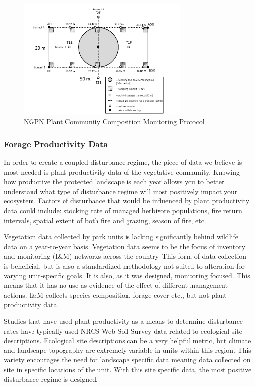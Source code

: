 \begin{figure}[th]
	\centering
	\includegraphics[width=0.75\textwidth]{figures/ngpsampling.png}\caption[NGPN Plant Community Composition Monitoring Protocol.]{NGPN Plant Community Composition Monitoring Protocol} \label{NGPNprotocol}
\end{figure}

\hypertarget{forage-productivity-data}{%
	\subsubsection{Forage Productivity
		Data}\label{forage-productivity-data}}

In order to create a coupled disturbance regime, the piece of data we believe is most needed is plant productivity data of the vegetative community. 
Knowing how productive the protected landscape is each year allows you to better understand what type of disturbance regime will most positively impact your ecosystem. 
Factors of disturbance that would be influenced by plant productivity data could include: stocking rate of managed herbivore populations, fire return intervals, spatial extent of both fire and grazing, season of fire, etc.

Vegetation data collected by park units is lacking significantly behind wildlife data on a year-to-year basis. 
Vegetation data seems to be the focus of inventory and monitoring (I\&M) networks across the country.
This form of data collection is beneficial, but is also a standardized methodology not suited to alteration for varying unit-specific goals. 
It is also, as it was designed, monitoring focused. 
This means that it has no use as evidence of the effect of different management actions. 
I\&M collects species composition, forage cover etc., but not plant productivity data.

Studies that have used plant productivity as a means to determine disturbance rates have typically used NRCS Web Soil Survey data related to ecological site descriptions. 
Ecological site descriptions can be a very helpful metric, but climate and landscape topography are extremely variable in units within this region. 
This variety encourages the need for landscape specific data meaning data collected on site in specific locations of the unit. 
With this site specific data, the most positive disturbance regime is designed.

